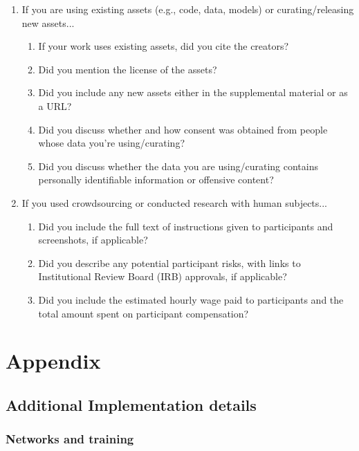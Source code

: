 \documentclass{article}
\begin{document}
\begin{enumerate}
\item If you are using existing assets (e.g., code, data, models) or curating/releasing new assets...
\begin{enumerate}
  \item If your work uses existing assets, did you cite the creators?
    \answerTODO{}
  \item Did you mention the license of the assets?
    \answerTODO{}
  \item Did you include any new assets either in the supplemental material or as a URL?
    \answerTODO{}
  \item Did you discuss whether and how consent was obtained from people whose data you're using/curating?
    \answerTODO{}
  \item Did you discuss whether the data you are using/curating contains personally identifiable information or offensive content?
    \answerTODO{}
\end{enumerate}

\item If you used crowdsourcing or conducted research with human subjects...
\begin{enumerate}
  \item Did you include the full text of instructions given to participants and screenshots, if applicable?
    \answerTODO{}
  \item Did you describe any potential participant risks, with links to Institutional Review Board (IRB) approvals, if applicable?
    \answerTODO{}
  \item Did you include the estimated hourly wage paid to participants and the total amount spent on participant compensation?
    \answerTODO{}
\end{enumerate}

\end{enumerate}


\appendix

\section{Appendix}


\subsection{Additional Implementation details}
\label{si:implementation}
\subsubsection{Networks and training}
\end{document}
